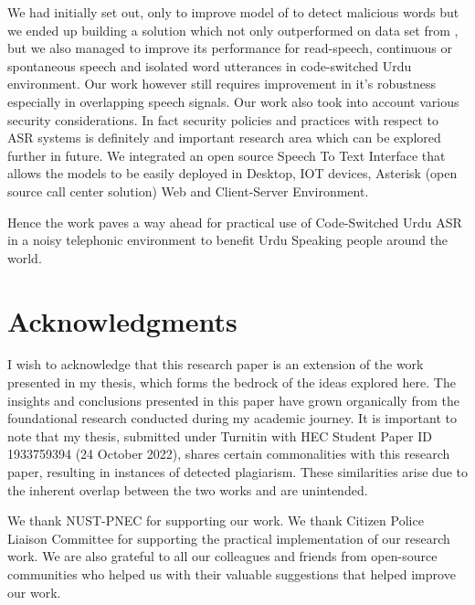 \documentclass[a4paper, 11pt]{article}
\begin{document}
We had initially set out, only to improve model of \cite{sehar_gul_detecting_2020} to detect malicious words but we ended up building a solution which not only outperformed on data set from \cite{sehar_gul_detecting_2020,ali_automatic_2015,qureshi_urdu_2021}, but we also managed to improve its performance for read-speech, continuous or spontaneous speech and isolated word utterances in code-switched Urdu environment. Our work however still requires improvement in it's robustness especially in overlapping speech signals. Our work also took into account various security considerations. In fact security policies and practices with respect to ASR systems is definitely and important research area which can be explored further in future. We integrated an open source Speech To Text Interface that allows the models to be easily deployed in Desktop, IOT devices, Asterisk (open source call center solution) Web and Client-Server Environment. 

Hence the work paves a way ahead for practical use of Code-Switched Urdu ASR in a noisy telephonic environment to benefit Urdu Speaking people around the world.

\section{Acknowledgments}
I wish to acknowledge that this research paper is an extension of the work presented in my thesis, which forms the bedrock of the ideas explored here. The insights and conclusions presented in this paper have grown organically from the foundational research conducted during my academic journey. It is important to note that my thesis, submitted under Turnitin with HEC Student Paper ID 1933759394 (24 October 2022), shares certain commonalities with this research paper, resulting in instances of detected plagiarism. These similarities arise due to the inherent overlap between the two works and are unintended.

We thank NUST-PNEC for supporting our work. We thank Citizen Police Liaison Committee for supporting the practical implementation of our research work. We are also grateful to all our colleagues and friends from open-source communities who helped us with their valuable suggestions that helped improve our work.


\newpage

 
\end{document}

